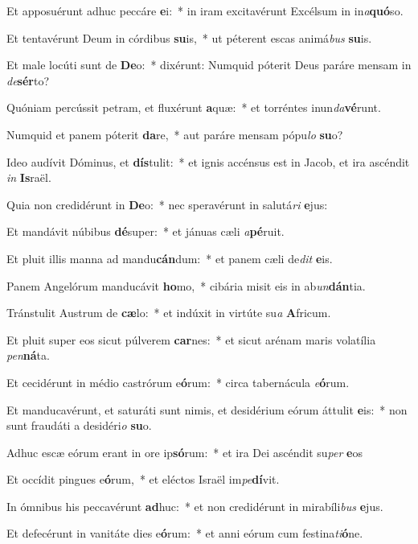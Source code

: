 \item Et apposuérunt adhuc peccáre \textbf{e}i:~* in iram excitavérunt Excélsum in in\textit{a}\textbf{quó}so.
\item Et tentavérunt Deum in córdibus \textbf{su}is,~* ut péterent escas animá\textit{bus} \textbf{su}is.
\item Et male locúti sunt de \textbf{De}o:~* dixérunt: Numquid póterit Deus paráre mensam in \textit{de}\textbf{sér}to?
\item Quóniam percússit petram, et fluxérunt \textbf{a}quæ:~* et torréntes inun\textit{da}\textbf{vé}runt.
\item Numquid et panem póterit \textbf{da}re,~* aut paráre mensam pópu\textit{lo} \textbf{su}o?
\item Ideo audívit Dóminus, et \textbf{dís}tulit:~* et ignis accénsus est in Jacob, et ira ascéndit \textit{in} \textbf{Is}raël.
\item Quia non credidérunt in \textbf{De}o:~* nec speravérunt in salutá\textit{ri} \textbf{e}jus:
\item Et mandávit núbibus \textbf{dé}super:~* et jánuas cæli \textit{a}\textbf{pé}ruit.
\item Et pluit illis manna ad mandu\textbf{cán}dum:~* et panem cæli de\textit{dit} \textbf{e}is.
\item Panem Angelórum manducávit \textbf{ho}mo,~* cibária misit eis in ab\textit{un}\textbf{dán}tia.
\item Tránstulit Austrum de \textbf{cæ}lo:~* et indúxit in virtúte su\textit{a} \textbf{A}fricum.
\item Et pluit super eos sicut púlverem \textbf{car}nes:~* et sicut arénam maris volatília \textit{pen}\textbf{ná}ta.
\item Et cecidérunt in médio castrórum e\textbf{ó}rum:~* circa tabernácula \textit{e}\textbf{ó}rum.
\item Et manducavérunt, et saturáti sunt nimis, et desidérium eórum áttulit \textbf{e}is:~* non sunt fraudáti a desidéri\textit{o} \textbf{su}o.
\item Adhuc escæ eórum erant in ore ip\textbf{só}rum:~* et ira Dei ascéndit su\textit{per} \textbf{e}os
\item Et occídit pingues e\textbf{ó}rum,~* et eléctos Israël im\textit{pe}\textbf{dí}vit.
\item In ómnibus his peccavérunt \textbf{ad}huc:~* et non credidérunt in mirabíli\textit{bus} \textbf{e}jus.
\item Et defecérunt in vanitáte dies e\textbf{ó}rum:~* et anni eórum cum festina\textit{ti}\textbf{ó}ne.
